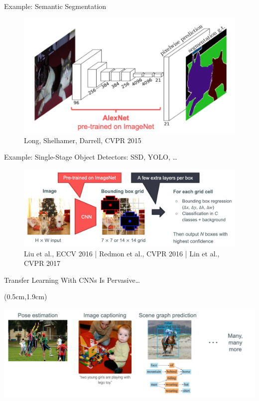 \documentclass[serif, aspectratio=169]{beamer}
\begin{document}
\begin{frame}{Example: Semantic Segmentation}
	\begin{figure}[htpb]
		\begin{center}
			\includegraphics[keepaspectratio, scale=0.25]{pic/sem}
			\caption*{\scriptsize Long, Shelhamer, Darrell, CVPR 2015}
		\end{center}
	\end{figure}
\end{frame}

\begin{frame}{Example: Single-Stage Object Detectors: SSD, YOLO, …}
	\begin{figure}[htpb]
		\begin{center}
			\includegraphics[keepaspectratio, scale=0.25]{pic/ssd}
			\caption*{\scriptsize Liu et al., ECCV 2016 | Redmon et al., CVPR 2016 | Lin et al., CVPR 2017}
		\end{center}
	\end{figure}
\end{frame}

\begin{frame}{Transfer Learning With CNNs Is Pervasive…}
	\begin{textblock*}{5cm}(0.5cm,1.9cm) %
		\begin{center}
			\includegraphics[keepaspectratio, scale=0.31]{pic/TL_examples}
		\end{center}
	\end{textblock*}
\end{frame}
\end{document}
